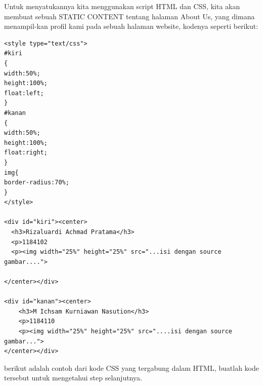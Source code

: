 \par Untuk menyatukannya kita menggunakan script HTML dan CSS, kita akan membuat sebuah STATIC CONTENT tentang halaman About Us, yang dimana menampil-kan profil kami pada sebuah halaman website, kodenya seperti berikut:

\begin{lstlisting}
<style type="text/css">
#kiri
{
width:50%;
height:100%;
float:left;
}
#kanan
{
width:50%;
height:100%;
float:right;
}
img{
border-radius:70%;
}
</style>

<div id="kiri"><center>
  <h3>Rizaluardi Achmad Pratama</h3>
  <p>1184102
  <p><img width="25%" height="25%" src="...isi dengan source gambar....">

</center></div>

<div id="kanan"><center>
    <h3>M Ichsam Kurniawan Nasution</h3>
    <p>1184110
    <p><img width="25%" height="25%" src="....isi dengan source gambar...">
</center></div>
\end{lstlisting}

\par berikut adalah contoh dari kode CSS yang tergabung dalam HTML, buatlah kode tersebut untuk mengetahui step selanjutnya.

